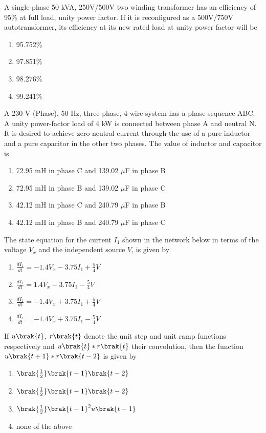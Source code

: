 \item A single-phase 50 kVA, 250V/500V two winding transformer has an efficiency of 95\% at full load, unity power factor. If it is reconfigured as a 500V/750V autotransformer, its efficiency at its new rated load at unity power factor will be
\begin{enumerate}
   \item 95.752\%
   \item 97.851\%
   \item 98.276\%
   \item 99.241\% \\
\end{enumerate}
\item A 230 V (Phase), 50 Hz, three-phase, 4-wire system has a phase sequence ABC. A unity power-factor load of 4 kW is connected between phase A and neutral N. It is desired to achieve zero neutral current through the use of a pure inductor and a pure capacitor in the other two phases. The value of inductor and capacitor is
\begin{enumerate}
    \item 72.95 mH in phase C and 139.02 $\mu$F in phase B
    \item 72.95 mH in phase B and 139.02 $\mu$F in phase C
    \item 42.12 mH in phase C and 240.79 $\mu$F in phase B
    \item 42.12 mH in phase B and 240.79 $\mu$F in phase C \\
\end{enumerate}
\item The state equation for the current $I_1$ shown in the network below in terms of the voltage $V_x$ and the independent source $V$, is given by
\begin{figure}[!ht]
\centering
\resizebox{0.5\textwidth}{!}{%

}%
\end{figure}
\begin{enumerate}
    \item $\frac{dI_1}{dt} = -1.4V_x - 3.75I_1 + \frac{5}{4}V$
    \item $\frac{dI_1}{dt} = 1.4V_x - 3.75I_1 - \frac{5}{4}V$
    \item $\frac{dI_1}{dt} = -1.4V_x + 3.75I_1 + \frac{5}{4}V$
    \item $\frac{dI_1}{dt} = -1.4V_x + 3.75I_1 - \frac{5}{4}V$
\end{enumerate}
\item If $u\brak{t}$, $r\brak{t}$ denote the unit step and unit ramp functions respectively and $u\brak{t}*r\brak{t}$ their convolution, then the function $u\brak{t+1}*r\brak{t-2}$ is given by
\begin{enumerate}
    \item $\brak{\frac{1}{2}}\brak{t-1}\brak{t-2}$
    \item $\brak{\frac{1}{2}}\brak{t-1}\brak{t-2}$
    \item $\brak{\frac{1}{2}}\brak{t-1}^2u\brak{t-1}$
    \item none of the above
\end{enumerate}
